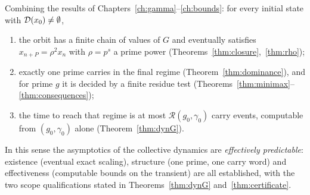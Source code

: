 Combining the results of Chapters~\ref{ch:gamma}--\ref{ch:bounds}: for every initial state with \(\mathcal{D}(x_0)\ne\emptyset\),
\begin{enumerate}[nosep]
\item the orbit has a finite chain of values of \(G\) and eventually satisfies \(x_{n+P}=\rho^2x_n\) with \(\rho=p^s\) a prime power (Theorems~\ref{thm:closure},~\ref{thm:rho});
\item exactly one prime carries in the final regime (Theorem~\ref{thm:dominance}), and for prime \(g\) it is decided by a finite residue test (Theorems~\ref{thm:minimax}--\ref{thm:consequences});
\item the time to reach that regime is at most \(\mathcal R(g_0,\gamma_0)\) carry events, computable from \((g_0,\gamma_0)\) alone (Theorem~\ref{thm:dynG}).
\end{enumerate}
In this sense the asymptotics of the collective dynamics are \emph{effectively predictable}: existence (eventual exact scaling), structure (one prime, one carry word) and effectiveness (computable bounds on the transient) are all established, with the two scope qualifications stated in Theorems~\ref{thm:dynG} and~\ref{thm:certificate}.

